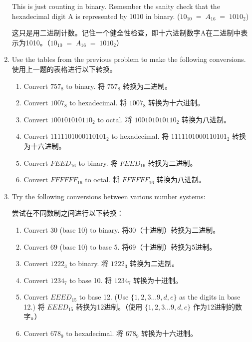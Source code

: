 \begin{enumerate}
{  This is just counting in binary.
  Remember the sanity check that the hexadecimal digit A is represented by 1010 in binary.
  ($10_{10} \; = \; A_{16} \; = \; 1010_{2}$)
  
  这只是用二进制计数。记住一个健全性检查，即十六进制数字A在二进制中表示为1010。（$10_{10} \; = \; A_{16} \; = \; 1010_{2}$）
  
  \vfill
  
  }
  
  \hintspagebreak
  \workbookpagebreak
  \textbookpagebreak
  
  \item Use the tables from the previous problem to make the following conversions.
  使用上一题的表格进行以下转换。
  \begin{enumerate}
  \item Convert $757_8$ to binary. 将 $757_8$ 转换为二进制。
  \item Convert $1007_8$ to hexadecimal. 将 $1007_8$ 转换为十六进制。
  \item Convert $100101010110_2$ to octal. 将 $100101010110_2$ 转换为八进制。
  \item Convert $1111101000110101_2$ to hexadecimal. 将 $1111101000110101_2$ 转换为十六进制。
  \item Convert $FEED_{16}$ to binary. 将 $FEED_{16}$ 转换为二进制。
  \item Convert $FFFFFF_{16}$ to octal. 将 $FFFFFF_{16}$ 转换为八进制。
  \end{enumerate}
  
  
  \wbvfill
  
  \item Try the following conversions between various number systems:
  
  尝试在不同数制之间进行以下转换：
  
  \begin{enumerate}
  \item Convert $30$ (base 10) to binary. 将30（十进制）转换为二进制。
  \item Convert $69$ (base 10) to base 5. 将69（十进制）转换为5进制。
  \item Convert $1222_3$ to binary. 将 $1222_3$ 转换为二进制。
  \item Convert $1234_7$ to base 10. 将 $1234_7$ 转换为十进制。
  \item Convert $EEED_{15}$ to base 12. (Use $\{1, 2, 3 \ldots 9, d, e\}$ as the digits in base 12.) 将 $EEED_{15}$ 转换为12进制。（使用 $\{1, 2, 3 \ldots 9, d, e\}$ 作为12进制的数字。）
  \item Convert $678_{9}$ to hexadecimal. 将 $678_{9}$ 转换为十六进制。
  \end{enumerate}
  

\end{enumerate}
